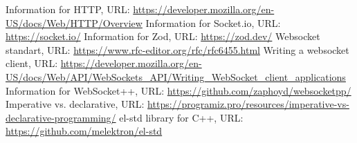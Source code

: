 \documentclass[conference]{IEEEtran}
\begin{document}
\begin{thebibliography}{00}

     Information for HTTP, URL: \url{https://developer.mozilla.org/en-US/docs/Web/HTTP/Overview}
     Information for Socket.io, URL: \url{https://socket.io/}
     Information for Zod, URL: \url{https://zod.dev/}
     Websocket standart, URL: \url{https://www.rfc-editor.org/rfc/rfc6455.html}
     Writing a websocket client, URL: \url{https://developer.mozilla.org/en-US/docs/Web/API/WebSockets_API/Writing_WebSocket_client_applications}
     Information for WebSocket++, URL: \url{https://github.com/zaphoyd/websocketpp/}
     Imperative vs. declarative, URL: \url{https://programiz.pro/resources/imperative-vs-declarative-programming/}
     el-std library for C++, URL: \url{https://github.com/melektron/el-std}
    
    
\end{thebibliography}
\end{document}
